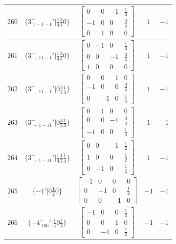 \documentclass[fleqn,8pt]{jsarticle}
\begin{document}
\begin{longtable}{ccccc}
$ 260 $ & $ \{3^{+}_{\,\,1-1-1}{}'|\frac{1}{4} \frac{3}{4} 0\} $ & $ \begin{bmatrix} 0 & 0 & -1 & \frac{1}{4} \\ -1 & 0 & 0 & \frac{3}{4} \\ 0 & 1 & 0 & 0 \end{bmatrix} $ & $ 1 $ & $ -1 $ \\ \hline
$ 261 $ & $ \{3^{-}_{\,\,-11-1}{}'|\frac{1}{4} \frac{3}{4} 0\} $ & $ \begin{bmatrix} 0 & -1 & 0 & \frac{1}{4} \\ 0 & 0 & -1 & \frac{3}{4} \\ 1 & 0 & 0 & 0 \end{bmatrix} $ & $ 1 $ & $ -1 $ \\ \hline
$ 262 $ & $ \{3^{+}_{\,\,-11-1}{}'|0 \frac{3}{4} \frac{1}{4}\} $ & $ \begin{bmatrix} 0 & 0 & 1 & 0 \\ -1 & 0 & 0 & \frac{3}{4} \\ 0 & -1 & 0 & \frac{1}{4} \end{bmatrix} $ & $ 1 $ & $ -1 $ \\ \hline
$ 263 $ & $ \{3^{-}_{\,\,-1-11}{}'|0 \frac{3}{4} \frac{1}{4}\} $ & $ \begin{bmatrix} 0 & 1 & 0 & 0 \\ 0 & 0 & -1 & \frac{3}{4} \\ -1 & 0 & 0 & \frac{1}{4} \end{bmatrix} $ & $ 1 $ & $ -1 $ \\ \hline
$ 264 $ & $ \{3^{+}_{\,\,-1-11}{}'|\frac{1}{4} \frac{1}{2} \frac{1}{4}\} $ & $ \begin{bmatrix} 0 & 0 & -1 & \frac{1}{4} \\ 1 & 0 & 0 & \frac{1}{2} \\ 0 & -1 & 0 & \frac{1}{4} \end{bmatrix} $ & $ 1 $ & $ -1 $ \\ \hline
$ 265 $ & $ \{-1{}'|0 \frac{1}{2} 0\} $ & $ \begin{bmatrix} -1 & 0 & 0 & 0 \\ 0 & -1 & 0 & \frac{1}{2} \\ 0 & 0 & -1 & 0 \end{bmatrix} $ & $ -1 $ & $ -1 $ \\ \hline
$ 266 $ & $ \{-4^{+}_{\,\,100}{}'|\frac{1}{4} 0 \frac{1}{4}\} $ & $ \begin{bmatrix} -1 & 0 & 0 & \frac{1}{4} \\ 0 & 0 & 1 & 0 \\ 0 & -1 & 0 & \frac{1}{4} \end{bmatrix} $ & $ -1 $ & $ -1 $ \\ \hline

\end{longtable}
\end{document}
